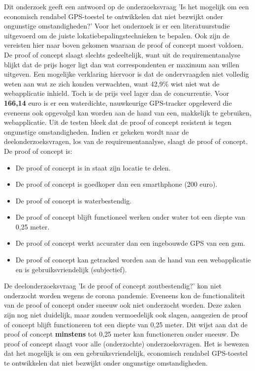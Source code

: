 Dit onderzoek geeft een antwoord op de onderzoeksvraag 'Is het mogelijk om een economisch rendabel GPS-toestel te ontwikkelen dat niet bezwijkt onder ongunstige omstandigheden?'
\newline
\newline
Voor het onderzoek is er een literatuurstudie uitgevoerd om de juiste lokatiebepalingstechnieken te bepalen. Ook zijn de vereisten hier naar boven gekomen waaraan de proof of concept moest voldoen. 
\newline
\newline
De proof of concept slaagt slechts gedeeltelijk, want uit de requirementanalyse blijkt dat de prijs hoger ligt dan wat correspondenten er maximum aan willen uitgeven. Een mogelijke verklaring hiervoor is dat de ondervraagden niet volledig weten aan wat ze zich konden verwachten, want 42,9\% wist niet wat de webapplicatie inhield. Toch is de prijs veel lager dan de concurrentie. Voor \textbf{166,14} euro is er een waterdichte, nauwkeurige GPS-tracker opgeleverd die eveneens ook opgevolgd kan worden aan de hand van een, makkelijk te gebruiken, webapplicatie. Uit de testen bleek dat de proof of concept resistent is tegen ongunstige omstandigheden. 
\newline
\newline
Indien er gekeken wordt naar de deelonderzoeksvragen, los van de requirementanalyse, slaagt de proof of concept. De proof of concept is:
\begin{itemize}
	\item De proof of concept is in staat zijn locatie te delen.
	\item De proof of concept is goedkoper dan een smarthphone (200 euro).
	\item De proof of concept is waterbestendig.
	\item De proof of concept blijft functioneel werken onder water tot een diepte van 0,25 meter.
	\item De proof of concept werkt accurater dan een ingebouwde GPS van een gsm.
	\item De proof of concept kan getracked worden aan de hand van een webapplicatie en is gebruiksvriendelijk (subjectief).
\end{itemize}
De deelonderzoeksvraag 'Is de proof of concept zoutbestendig?' kon niet onderzocht worden wegens de corona pandemie. Eveneens kon de functionaliteit van de proof of concept onder sneeuw ook niet onderzocht worden. Deze zaken zijn nog niet duidelijk, maar zouden vermoedelijk ook slagen, aangezien de proof of concept blijft functioneren tot een diepte van 0,25 meter. Dit wijst aan dat de proof of concept \textbf{minstens} tot 0,25 meter kan functioneren onder sneeuw. 
\newline
De proof of concept slaagt voor alle (onderzochte) onderzoeksvragen. Het is bewezen dat het mogelijk is om een gebruiksvriendelijk, economisch rendabel GPS-toestel te ontwikkelen dat niet bezwijkt onder ongunstige omstandigheden.